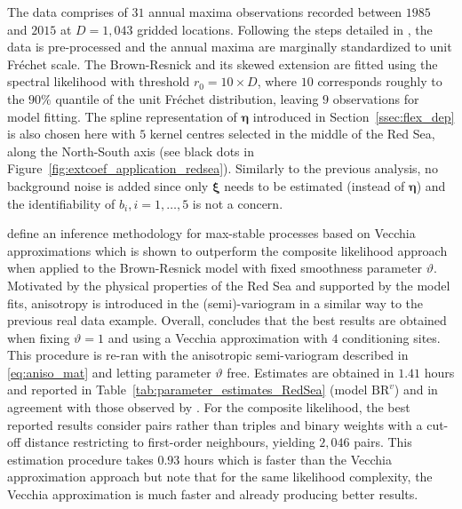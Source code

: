 \documentclass[12pt]{article}
\begin{document}
The data comprises of $31$ annual maxima observations recorded between $1985$ and $2015$ at $D=1,043$ gridded locations.
%
Following the steps detailed in \cite{Huser.Zhong:2023}, the data is pre-processed and the annual maxima are marginally standardized to unit Fr\'{e}chet scale. 
%
The Brown-Resnick and its skewed extension are fitted using the spectral likelihood with threshold $r_0=10\times D$, where $10$ corresponds roughly to the $90\%$ quantile of the unit Fr\'echet distribution, leaving $9$ observations for model fitting.
%
The spline representation of $\bm\eta$ introduced in Section~\ref{ssec:flex_dep} is also chosen here with $5$ kernel centres selected in the middle of the Red Sea, along the North-South axis (see black dots in Figure~\ref{fig:extcoef_application_redsea}). Similarly to the previous analysis, no background noise is added since only $\bm\xi$ needs to be estimated (instead of $\bm\eta$) and the identifiability of $b_i,i=1,\dots,5$ is not a concern. 
%

\cite{Huser.Zhong:2023} define an inference methodology for max-stable processes based on Vecchia approximations which is shown to outperform the composite likelihood approach when applied to the Brown-Resnick model with fixed smoothness parameter $\vartheta$.
Motivated by the physical properties of the Red Sea and supported by the model fits, anisotropy is introduced in the (semi)-variogram in a similar way to the previous real data example. 
%
Overall, \cite{Huser.Zhong:2023} concludes that the best results are obtained when fixing $\vartheta=1$ and using a Vecchia approximation with $4$ conditioning sites. This procedure is re-ran with the anisotropic semi-variogram described in \eqref{eq:aniso_mat} and letting parameter $\vartheta$ free. Estimates are obtained in $1.41$ hours and reported in Table~\ref{tab:parameter_estimates_RedSea} (model $\textrm{BR}^v$) and in agreement with those observed by \citet{Huser.Zhong:2023}. 
%
For the composite likelihood, the best reported results consider pairs rather than triples and binary weights with a cut-off distance restricting to first-order neighbours, yielding $2,046$ pairs. This estimation procedure takes $0.93$ hours  which is faster than the Vecchia approximation approach but \cite{Huser.Zhong:2023} note that for the same likelihood complexity, the Vecchia approximation is much faster and already producing better results. 
\end{document}
